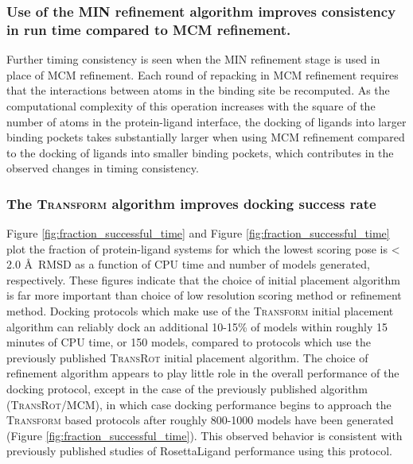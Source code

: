 \subsubsection{Use of the MIN refinement algorithm improves consistency in run time compared to MCM refinement.} 
Further timing consistency is seen when the MIN refinement stage is used in place of MCM refinement.
Each round of repacking in MCM refinement requires that the interactions between atoms in the binding site be recomputed.
As the computational complexity of this operation increases with the square of the number of atoms in the protein-ligand interface, the docking of ligands into larger binding pockets takes substantially larger when using MCM refinement compared to the docking of ligands into smaller binding pockets, which contributes in the observed changes in timing consistency.

\subsubsection{The \textsc{Transform} algorithm improves docking success rate}
Figure \ref{fig:fraction_successful_time} and Figure \ref{fig:fraction_successful_time} plot the fraction of protein-ligand systems for which the lowest scoring pose is < 2.0 \AA\ RMSD as a function of CPU time and number of models generated, respectively.
These figures indicate that the choice of initial placement algorithm is far more important than choice of low resolution scoring method or refinement method.
Docking protocols which make use of the \textsc{Transform} initial placement algorithm can reliably dock an additional 10-15\% of models within roughly 15 minutes of CPU time, or 150 models, compared to protocols which use the previously published \textsc{TransRot} initial placement algorithm.
The choice of refinement algorithm appears to play little role in the overall performance of the docking protocol, except in the case of the previously published algorithm (\textsc{TransRot}/MCM), in which case docking performance begins to approach the \textsc{Transform} based protocols after roughly 800-1000 models have been generated (Figure \ref{fig:fraction_successful_time}).
This observed behavior is consistent with previously published studies of RosettaLigand performance using this protocol\citep{Davis:2009fx,Combs:2013bl,Lemmon:2012ku}. 

